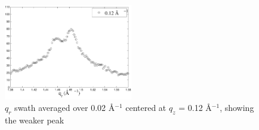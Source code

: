 \begin{figure}[htbp]
  \centering
  \includegraphics[width=0.5\textwidth]{figures/ripple/NGIWAXS/qrplot4}
  \caption[$q_r$ swath averaged over 0.02 \AA$^{-1}$ centered at 
  $q_z$ = 0.12 \AA$^{-1}$]{$q_r$ swath averaged over 0.02 \AA$^{-1}$ centered at 
  $q_z$ = 0.12 \AA$^{-1}$, showing the weaker peak}
  \label{fig:weak_peak}
\end{figure}

